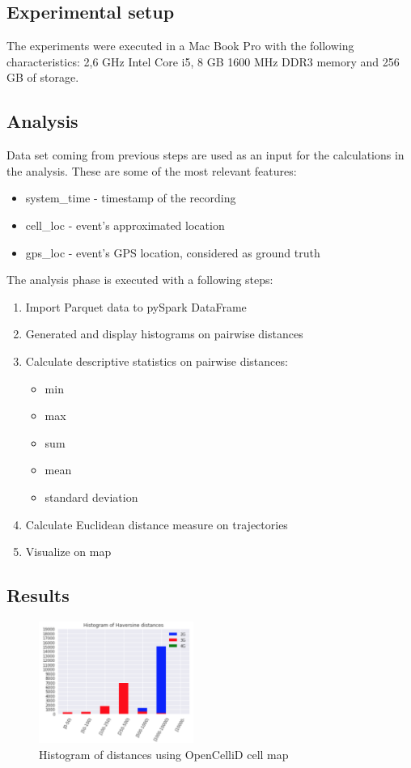\subsection{Experimental setup}
The experiments were executed in a Mac Book Pro with the following characteristics: 2,6 GHz Intel Core i5, 8 GB 1600 MHz DDR3 memory and 256 GB of storage.

\subsection{Analysis}
Data set coming from previous steps are used as an input for the calculations in the analysis. These are some of the most relevant features:
\begin{itemize}
    \item system\_time - timestamp of the recording
    \item cell\_loc - event's approximated location
    \item gps\_loc - event's GPS location, considered as ground truth
\end{itemize}

The analysis phase is executed with a following steps:
\begin{enumerate}
    \item Import Parquet data to pySpark DataFrame
    \item Generated and display histograms on pairwise distances
    \item Calculate descriptive statistics on pairwise distances:
        \begin{itemize}
            \item min
            \item max
            \item sum
            \item mean
            \item standard deviation
        \end{itemize}
    \item Calculate Euclidean distance measure on trajectories
    \item Visualize on map
\end{enumerate}

\subsection{Results}
\begin{figure}[h!]
    \centering
    \includegraphics[width=0.45\textwidth]{images/histogram.png}
    \caption{Histogram of distances using OpenCelliD cell map}
    \label{fig:hist_opencell}
\end{figure}

